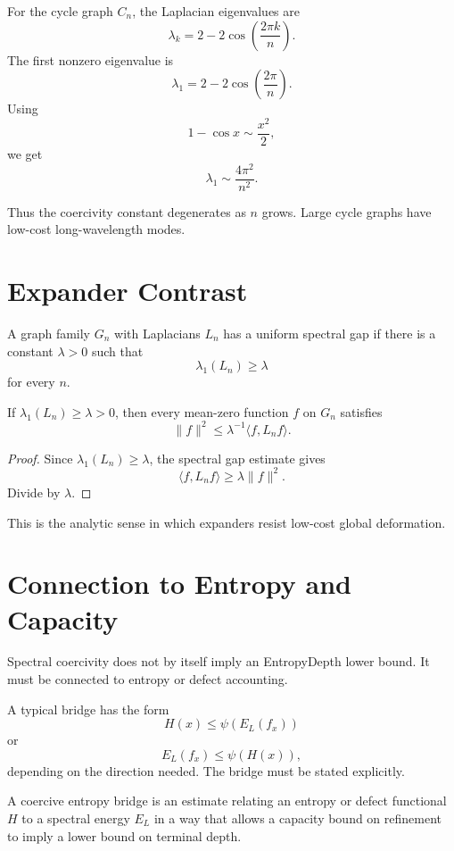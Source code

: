 For the cycle graph \(C_n\), the Laplacian eigenvalues are
\[
\lambda_k=2-2\cos\left(\frac{2\pi k}{n}\right).
\]
The first nonzero eigenvalue is
\[
\lambda_1=2-2\cos\left(\frac{2\pi}{n}\right).
\]
Using
\[
1-\cos x\sim \frac{x^2}{2},
\]
we get
\[
\lambda_1\sim \frac{4\pi^2}{n^2}.
\]

Thus the coercivity constant degenerates as \(n\) grows. Large cycle graphs
have low-cost long-wavelength modes.

\section{Expander Contrast}

A graph family \(G_n\) with Laplacians \(L_n\) has a uniform spectral gap if
there is a constant \(\lambda>0\) such that
\[
\lambda_1(L_n)\ge \lambda
\]
for every \(n\).

\begin{theorem}
If \(\lambda_1(L_n)\ge\lambda>0\), then every mean-zero function \(f\) on
\(G_n\) satisfies
\[
\|f\|^2\le \lambda^{-1}\langle f,{L_n}f\rangle.
\]
\end{theorem}

\begin{proof}
Since \(\lambda_1(L_n)\ge\lambda\), the spectral gap estimate gives
\[
\langle f,{L_n}f\rangle\ge \lambda\|f\|^2.
\]
Divide by \(\lambda\).
\end{proof}

This is the analytic sense in which expanders resist low-cost global
deformation.

\section{Connection to Entropy and Capacity}

Spectral coercivity does not by itself imply an EntropyDepth lower bound.
It must be connected to entropy or defect accounting.

A typical bridge has the form
\[
H(x)\le \psi(E_L(f_x))
\]
or
\[
E_L(f_x)\le \psi(H(x)),
\]
depending on the direction needed. The bridge must be stated explicitly.

\begin{definition}
A coercive entropy bridge is an estimate relating an entropy or defect
functional \(H\) to a spectral energy \(E_L\) in a way that allows a capacity
bound on refinement to imply a lower bound on terminal depth.
\end{definition}

